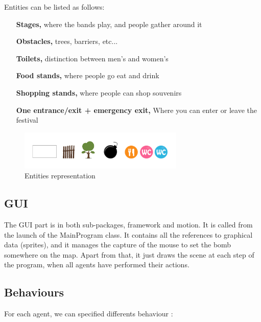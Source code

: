 Entities can be listed as follows:\\

\begin{itemize}
	\item[{\bf Stages,}] where the bands play, and people gather around it
	\item[{\bf Obstacles,}] trees, barriers, etc...
	\item[{\bf Toilets,}] distinction between men’s and women’s
	\item[{\bf Food stands,}] where people go eat and drink
	\item[{\bf Shopping stands,}] where people can shop souvenirs
	\item[{\bf One entrance/exit + emergency exit,}] Where you can enter or
	leave the festival
\end{itemize}

\begin{figure}[h]
	\begin{center}
		\includegraphics[width=0.7\textwidth]{img/environment.png}
	\end{center}
	\caption{Entities representation}
\end{figure}

\subsection{GUI}

The GUI part is in both sub-packages, framework and motion. It is called from
the launch of the MainProgram class. It contains all the references to graphical
data (sprites), and it manages the capture of the mouse to set the bomb
somewhere on the map. Apart from that, it just draws the scene at each step of
the program, when all agents have performed their actions.

\subsection{Behaviours}

For each agent, we can specified differents behaviour :\\

